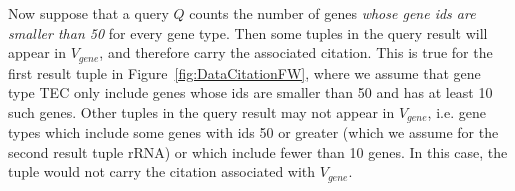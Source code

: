 Now suppose that a query $Q$ counts the number of genes \textit{whose gene ids are smaller than 50} for every gene type. Then some tuples in the query result will appear in $V_{gene}$, and therefore carry the associated citation.  This is true for the first result tuple in Figure~\ref{fig:DataCitationFW},  where we assume that gene type TEC only include genes whose ids are smaller than 50 and has at least 10 such genes.  Other tuples in the query result may not appear in $V_{gene}$, i.e. gene types which include some genes with ids 50 or greater (which we assume for the second result tuple rRNA)  or which include fewer than 10 genes.  In this case, the tuple would not carry the citation associated with $V_{gene}$.

